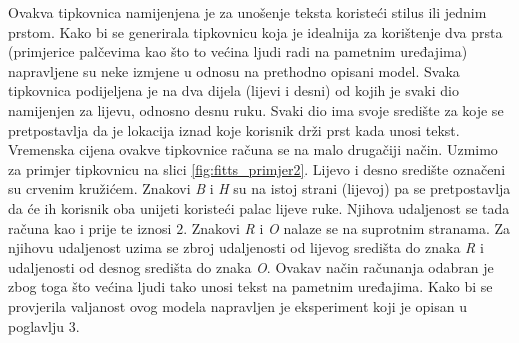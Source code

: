 \documentclass[times, utf8, zavrsni]{fer}
\begin{document}
Ovakva tipkovnica namijenjena je za unošenje teksta koristeći stilus ili jednim prstom. Kako bi se generirala tipkovnicu koja je idealnija za korištenje dva prsta (primjerice palčevima kao što to većina ljudi radi na pametnim uređajima) napravljene su neke izmjene u odnosu na prethodno opisani model. Svaka tipkovnica podijeljena je na dva dijela (lijevi i desni) od kojih je svaki dio namijenjen za lijevu, odnosno desnu ruku. Svaki dio ima svoje središte za koje se pretpostavlja da je lokacija iznad koje korisnik drži prst kada unosi tekst. Vremenska cijena ovakve tipkovnice računa se na malo drugačiji način. Uzmimo za primjer tipkovnicu na slici \ref{fig:fitts_primjer2}. Lijevo i desno središte označeni su crvenim kružićem. Znakovi \emph{B} i \emph{H} su na istoj strani (lijevoj) pa se pretpostavlja da će ih korisnik oba unijeti koristeći palac lijeve ruke. Njihova udaljenost se tada računa kao i prije te iznosi $2$. Znakovi \emph{R} i \emph{O} nalaze se na suprotnim stranama. Za njihovu udaljenost uzima se zbroj udaljenosti od lijevog središta do znaka \emph{R} i udaljenosti od desnog središta do znaka \emph{O}. Ovakav način računanja odabran je zbog toga što većina ljudi tako unosi tekst na pametnim uređajima. Kako bi se provjerila valjanost ovog modela napravljen je eksperiment koji je opisan u poglavlju 3.
\end{document}
